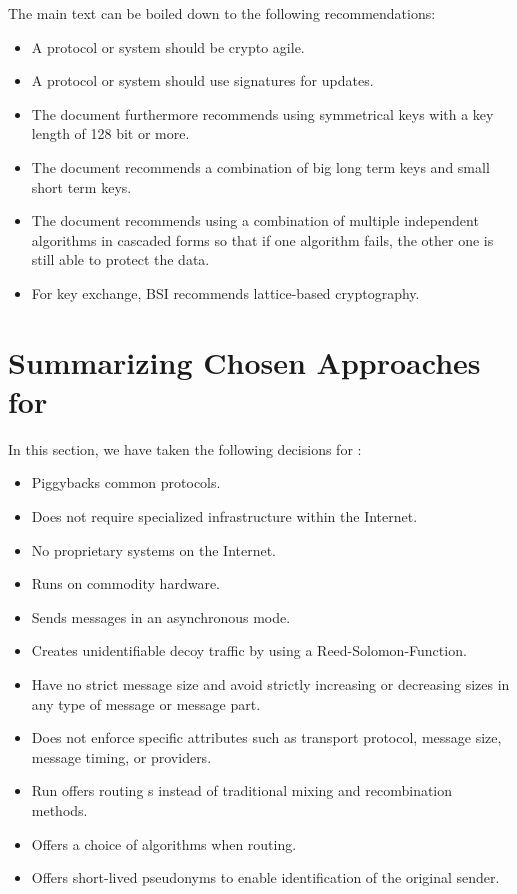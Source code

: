 \begin{itemize}
	The main text can be boiled down to the following recommendations:
	\begin{itemize}
		\item A protocol or system should be crypto agile.
		\item A protocol or system should use signatures for updates.
		\item The document furthermore recommends using symmetrical keys with a key length of 128 bit or more.
		\item The document recommends a combination of big long term keys and small short term keys.
		\item The document recommends using a combination of multiple independent algorithms in cascaded forms so that if one algorithm fails, the other one is still able to protect the data.
		\item For key exchange, BSI recommends lattice-based cryptography.
	\end{itemize} 
\end{itemize}

\section{Summarizing Chosen Approaches for \MessageVortex}\label{sec:reqSummary}
In this section, we have taken the following decisions for \MessageVortex:
\begin{itemize}
	\item Piggybacks common protocols.
	\item Does not require specialized infrastructure within the Internet.
	\item No proprietary systems on the Internet.
	\item Runs on commodity hardware.
	\item Sends messages in an asynchronous mode.
	\item Creates unidentifiable decoy traffic by using a Reed-Solomon-Function.
	\item Have no strict message size and avoid strictly increasing or decreasing sizes in any type of message or message part.
	\item Does not enforce specific attributes such as transport protocol, message size, message timing, or providers.
	\item Run offers routing s instead of traditional mixing and recombination methods.
	\item Offers a choice of algorithms when routing.
	\item Offers short-lived pseudonyms to enable identification of the original sender.
\end{itemize}

